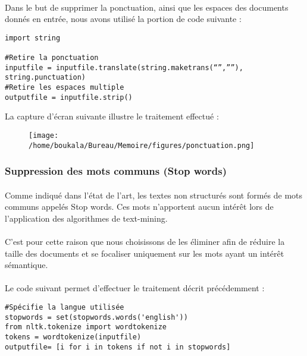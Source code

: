 \documentclass[12pt, a4paper, oneside]{book}
\begin{document}
\paragraph{}
Dans le but de supprimer la ponctuation, ainsi que les espaces des documents donnés en entrée, nous avons utilisé la portion de code suivante : 
\begin{verbatim}
import string

#Retire la ponctuation
inputfile = inputfile.translate(string.maketrans(“”,””), string.punctuation) 
#Retire les espaces multiple
outputfile = inputfile.strip()
\end{verbatim}

La capture d'écran suivante illustre le traitement effectué :


\begin{figure}[h!]
\begin{center}
\texttt{[image: /home/boukala/Bureau/Memoire/figures/ponctuation.png]}
\end{center}
\end{figure}



\subsubsection{Suppression des mots communs (Stop words)}
\paragraph{}
Comme indiqué dans l'état de l'art, les textes non structurés sont formés de mots communs appelés Stop words. 
Ces mots n'apportent aucun intérêt lors de l'application des algorithmes de text-mining. 
\paragraph{}
C'est pour cette raison que nous choisissons de les éliminer afin de réduire la taille des documents et se focaliser uniquement sur les mots ayant un intérêt sémantique.
\paragraph{}
Le code suivant permet d'effectuer le traitement décrit précédemment :

\begin{verbatim}
#Spécifie la langue utilisée 
stopwords = set(stopwords.words('english'))
from nltk.tokenize import wordtokenize
tokens = wordtokenize(inputfile)
outputfile= [i for i in tokens if not i in stopwords]
\end{verbatim}
\end{document}
